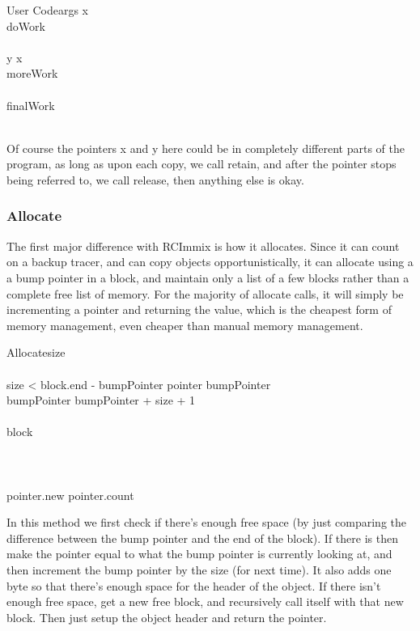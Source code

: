 \documentclass{article}
\begin{document}
\begin{pseudocode}{User Code}{args}
\MAIN
	x \GETS {}\\
	doWork\\
	\\
	y \GETS x\\
	moreWork\\
	\\
	finalWork\\
	\\
\ENDMAIN
\end{pseudocode}

Of course the pointers x and y here could be in completely different parts of the program, as long as upon each copy, we call retain, and after the pointer stops being referred to, we call release, then anything else is okay.

\subsubsection{Allocate}

The first major difference with RCImmix is how it allocates. Since it can count on a backup tracer, and can copy objects opportunistically, it can allocate using a a bump pointer in a block, and maintain only a list of a few blocks rather than a complete free list of memory. For the majority of allocate calls, it will simply be incrementing a pointer and returning the value, which is the cheapest form of memory management, even cheaper than manual memory management.


\begin{pseudocode}{Allocate}{size}
	\\\\
	\IF size < block.end - bumpPointer \THEN
		\BEGIN
			pointer \GETS bumpPointer\\
			bumpPointer \GETS bumpPointer + size + 1\\
		\END\\
	\ELSE
		\BEGIN
			block \GETS {}\\
			\\
		\END\\\\
	pointer.new \GETS \TRUE
	pointer.count 
\end{pseudocode}

In this method we first check if there's enough free space (by just comparing the difference between the bump pointer and the end of the block). If there is then make the pointer equal to what the bump pointer is currently looking at, and then increment the bump pointer by the size (for next time). It also adds one byte so that there's enough space for the header of the object. If there isn't enough free space, get a new free block, and recursively call itself with that new block. Then just setup the object header and return the pointer. 
\end{document}
